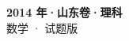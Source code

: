 \documentclass[zihao=-4, a4paper]{ctexart}
\begin{document}
\begin{center}
  {\Large\bfseries 2014 年·山东卷·理科}\\[4pt]
  {\large 数学 · 试题版}
\end{center}
\medskip
{}

\end{document}

